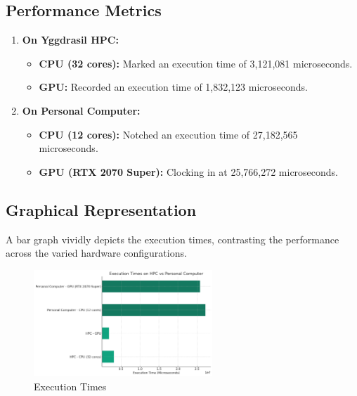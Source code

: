 \documentclass[11pt]{article}
\begin{document}
    \hypertarget{performance-metrics}{%
    \subsection{Performance Metrics}\label{performance-metrics}}

    \begin{enumerate}
    \def\labelenumi{\arabic{enumi}.}

    \item
      \textbf{On Yggdrasil HPC:}

      \begin{itemize}
      
      \item
        \textbf{CPU (32 cores):} Marked an execution time of 3,121,081 microseconds.
      \item
        \textbf{GPU:} Recorded an execution time of 1,832,123 microseconds.
      \end{itemize}
    \item
      \textbf{On Personal Computer:}

      \begin{itemize}
      
      \item
        \textbf{CPU (12 cores):} Notched an execution time of 27,182,565
        microseconds.
      \item
        \textbf{GPU (RTX 2070 Super):} Clocking in at 25,766,272
        microseconds.
      \end{itemize}
    \end{enumerate}

    \hypertarget{graphical-representation}{%
    \subsection{Graphical Representation}\label{graphical-representation}}

    A bar graph vividly depicts the execution times, contrasting the
    performance across the varied hardware configurations.

    \begin{figure}[ht]
    \centering
    \includegraphics[width=0.6\textwidth]{img/execution_time.png}
    \caption{Execution Times}
    \end{figure}
\end{document}
